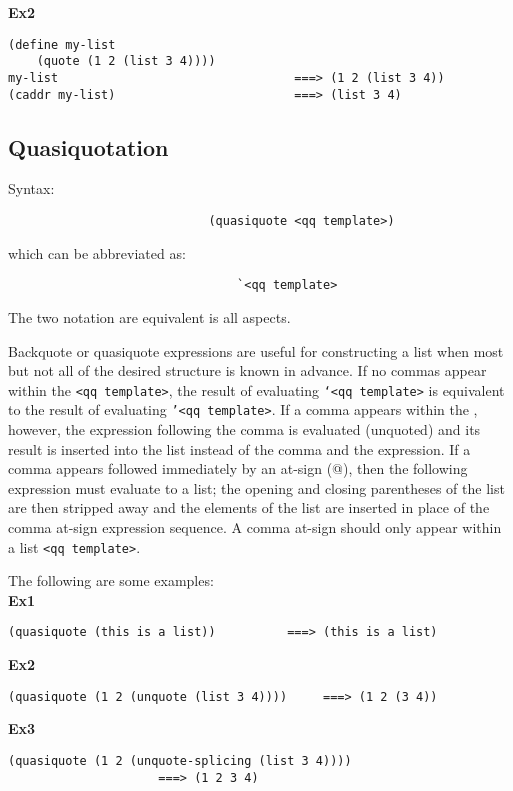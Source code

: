 \documentclass{article}
\begin{document}
\textbf{Ex2}
\begin{lstlisting}
(define my-list
    (quote (1 2 (list 3 4))))
my-list                                 ===> (1 2 (list 3 4))
(caddr my-list)                         ===> (list 3 4)
\end{lstlisting}

\subsection*{Quasiquotation}
Syntax:
\begin{lstlisting}
                            (quasiquote <qq template>)
\end{lstlisting}
which can be abbreviated as:
\begin{lstlisting}
                                `<qq template>
\end{lstlisting}
The two notation are equivalent is all aspects.

Backquote or quasiquote expressions are useful for constructing a list when most but not all of the desired structure is known in advance. If no commas appear within the \texttt{<qq template>}, the result of evaluating \texttt{`<qq template>} is equivalent to the result of evaluating \texttt{'<qq template>}. If a comma appears within the , however, the expression following the comma is evaluated (unquoted) and its result is inserted into the list instead of the comma and the expression. If a comma appears followed immediately by an at-sign (@), then the following expression must evaluate to a list; the opening and closing parentheses of the list are then stripped away and the elements of the list are inserted in place of the comma at-sign expression sequence. A comma at-sign should only appear within a list \texttt{<qq template>}.

The following are some examples:\\
\textbf{Ex1}
\begin{lstlisting}
(quasiquote (this is a list))          ===> (this is a list)
\end{lstlisting}

\textbf{Ex2}
\begin{lstlisting}
(quasiquote (1 2 (unquote (list 3 4))))     ===> (1 2 (3 4))
\end{lstlisting}

\textbf{Ex3}
\begin{lstlisting}
(quasiquote (1 2 (unquote-splicing (list 3 4))))
                     ===> (1 2 3 4)
\end{lstlisting}
\end{document}

